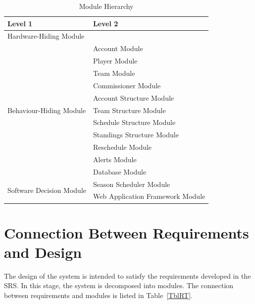 \documentclass[12pt, titlepage]{article}
\begin{document}
\begin{table}[h!]
\centering
\begin{tabular}{p{} p{}}
\toprule
\textbf{Level 1} & \textbf{Level 2}\\
\midrule

{Hardware-Hiding Module} & ~ \\
\midrule

\multirow{11}{0.3\textwidth}{Behaviour-Hiding Module} & Account Module\\
& Player Module\\
& Team Module\\
& Commissioner Module\\
& Account Structure Module\\
& Team Structure Module\\
& Schedule Structure Module\\
& Standings Structure Module\\
& Reschedule Module\\
& Alerts Module\\
& Database Module\\
\midrule

\multirow{2}{0.3\textwidth}{Software Decision Module} & Season Scheduler
Module\\
& Web Application Framework Module\\
\bottomrule

\end{tabular}
\caption{Module Hierarchy}
\label{TblMH}
\end{table}

\section{Connection Between Requirements and Design} \label{SecConnection}

The design of the system is intended to satisfy the requirements developed in
the SRS. In this stage, the system is decomposed into modules. The connection
between requirements and modules is listed in Table~\ref{TblRT}.

\end{document}
